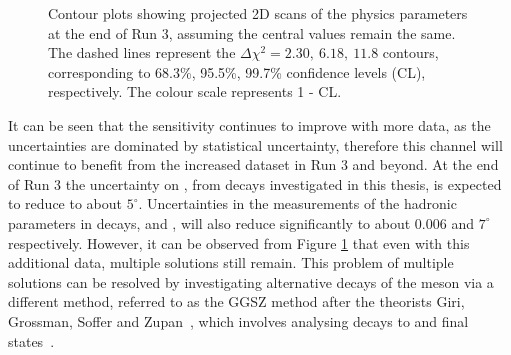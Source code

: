 \begin{figure}[h]
\centering
{}
\caption{Contour plots showing projected 2D scans of the physics parameters at the end of Run 3, assuming the central values remain the same. The dashed lines represent the $\Delta \chi^2 = 2.30,\ 6.18,\ 11.8$ contours, corresponding to 68.3\%, 95.5\%, 99.7\% confidence levels (CL), respectively. The colour scale represents 1 - CL.}
\label{gammadiniplotsrun3}
\end{figure}

It can be seen that the sensitivity continues to improve with more data, as the uncertainties are dominated by statistical uncertainty, therefore this channel will continue to benefit from the increased dataset in Run 3 and beyond. At the end of Run 3 the uncertainty on \Pgamma, from \btodkst decays investigated in this thesis, is expected to reduce to about $5^{\circ}$. Uncertainties in the measurements of the hadronic parameters in \btodkst decays, \rb and \deltab, will also reduce significantly to about $0.006$ and $7^{\circ}$ respectively. However, it can be observed from Figure \ref{gammadiniplotsrun3} that even with this additional data, multiple solutions still remain. This problem of multiple solutions can be resolved by investigating alternative decays of the \Dz meson via a different method, referred to as the GGSZ method after the theorists Giri, Grossman, Soffer and Zupan~\cite{GGSZ}, which involves analysing \Dz decays to \KS\pip\pim and \KS\Kp\Km final states~\cite{LHCb-PAPER-2012-027,LHCb-PAPER-2014-041}.

